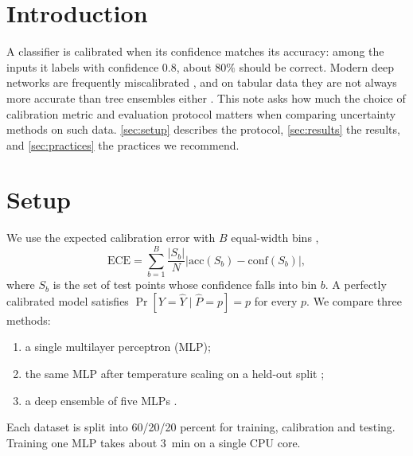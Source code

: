 \documentclass{article}
\newcommand{\ece}{\mathrm{ECE}}
\newcommand{\prob}[1]{\Pr\left[#1\right]}
\begin{document}

\printAffiliationsAndNotice{}

\begin{abstract}
Deep networks trained on tabular data are often overconfident, and benchmarks that report only accuracy hide the problem.
We measure calibration on a suite of tabular classification tasks, compare temperature scaling with deep ensembles, and find that a short list of evaluation practices changes which method looks best.
\end{abstract}

\section{Introduction}
\label{sec:introduction}

A classifier is calibrated when its confidence matches its accuracy: among the inputs it labels with confidence $0.8$, about $80\%$ should be correct.
Modern deep networks are frequently miscalibrated \citep{guo2017calibration}, and on tabular data they are not always more accurate than tree ensembles either \citep{grinsztajn2022tree}.
This note asks how much the choice of calibration metric and evaluation protocol matters when comparing uncertainty methods on such data.
\autoref{sec:setup} describes the protocol, \autoref{sec:results} the results, and \autoref{sec:practices} the practices we recommend.

\section{Setup}
\label{sec:setup}

We use the expected calibration error with $B$ equal-width bins \citep{naeini2015obtaining},
\[
  \ece = \sum_{b=1}^{B} \frac{|S_b|}{N} \left| \mathrm{acc}(S_b) - \mathrm{conf}(S_b) \right|,
\]
where $S_b$ is the set of test points whose confidence falls into bin $b$.
A perfectly calibrated model satisfies $\prob{Y = \hat{Y} \mid \hat{P} = p} = p$ for every $p$.
We compare three methods:
\begin{enumerate}[label=(\alph*)]
  \item a single multilayer perceptron (MLP);
  \item the same MLP after temperature scaling on a held-out split \citep{guo2017calibration};
  \item a deep ensemble of five MLPs \citep{lakshminarayanan2017simple}.
\end{enumerate}
Each dataset is split into \num{60}/\num{20}/\num{20} percent for training, calibration and testing.
Training one MLP takes about \SI{3}{\minute} on a single CPU core.
\end{document}
